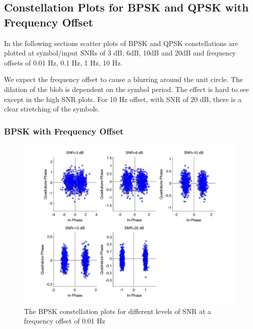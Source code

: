 \documentclass[]{article}
\begin{document}
\subsection{Constellation Plots for BPSK and QPSK with Frequency Offset}
In the following sections scatter plots of  BPSK and QPSK constellations are plotted at symbol/input SNRs of 3 dB, 6dB, 10dB and 20dB and frequency offsets of 0.01 Hz, 0.1 Hz, 1 Hz, 10 Hz.

We expect the frequency offset to cause a blurring around the unit circle.  The dilation of the blob is dependent on the symbol period.  The effect is hard to see except in the high SNR plots.  For 10 Hz offset, with SNR of 20 dB, there is a clear stretching of the symbols.    

\subsubsection{BPSK with Frequency Offset}
\label{sec:bpsk_freqConst}
\begin{figure}[H]
\centering
\hspace*{-2cm}\includegraphics[width=1.3\textwidth]{bpConstfo1.jpg}
\caption{The BPSK constellation plots for different levels of SNR at a frequency offset of 0.01 Hz}
\end{figure}
\end{document}

